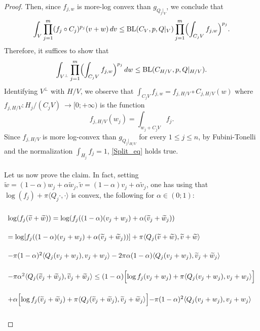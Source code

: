 \documentclass[10pt,a4paper]{amsart}
\newcommand{\ds}{\displaystyle}
\newcommand{\nm}{\noalign{\smallskip}}
\renewcommand{\tilde}{\widetilde}
\begin{document}
\begin{proof}
    Then, since $f_{j,w}$ is more-log convex than $g_{Q_j|_V}$, we conclude that $$\int_V \prod_{j=1}^m (f_j \circ C_j)^{p_j}(v+w)\, dv \leq \mathrm{BL}(\textbf{C}_V,p,\textbf{Q}|_V)\prod_{j=1}^m \Bigl (\int_{C_jV}f_{j,w}\Bigl)^{p_j}.$$ Therefore, it suffices to show that \begin{equation} \label{Split_eq}\int_{V^\perp}\prod_{j=1}^m \Bigl( \int_{C_jV}f_{j,w}\Bigl)^{p_j}\, dw \leq \mathrm{BL}(\textbf{C}_{H/V},p,\textbf{Q}|_{H/V}).\end{equation} Identifying $V^\perp$ with $H/V$, we observe that $\ds \int_{C_jV}f_{j,w}=f_{j,H/V}\circ C_{j,H/V}(w)$ where $f_{j,H/V}:H_j/(C_jV)\ \longrightarrow [0;+\infty)$ is the function $$f_{j,H/V}(w_j)=\int_{w_j+C_jV}f_j.$$ 
    Since $f_{j,{H/V}}$ is more log-convex than $g_{Q_j|_{H/V}}$ for every $1 \leq j \leq n$, by Fubini-Tonelli and the normalization $\int_{H_j}f_j=1$, \cref{Split_eq} holds true. \\ \hfill \\ Let us now prove the claim. In fact, setting $\tilde w=(1-\alpha)w_j+\alpha \tilde w_j, \tilde v=(1-\alpha)v_j+\alpha \tilde v_j$, one has using that $\log(f_j)+\pi \langle Q_j \cdot,\cdot \rangle$ is convex, the following for $\alpha \in (0;1)$:  \begin{equation} \label{Log_Convexity_Superposition} \begin{array}{lll}
    \\ \log(f_j(\tilde v+\tilde w)) = \log(f_j((1-\alpha)(v_j+w_j)+\alpha(\tilde v_j+\tilde w_j)) \\ \\
    \nm 
    = \log[f_j((1-\alpha)(v_j+w_j)+\alpha(\tilde v_j+\tilde w_j))] +\pi \langle Q_j (\tilde v+\tilde w),\tilde v+\tilde w \rangle \\ \\
    \nm 
    -\pi(1-\alpha)^2 \langle Q_j(v_j+w_j),v_j+w_j \rangle-2\pi \alpha(1-\alpha)\langle Q_j(v_j+w_j),\tilde v_j+\tilde w_j \rangle   \\ \\
    \nm 
    -\pi \alpha^2 \langle Q_j(\tilde v_j+\tilde w_j),\tilde v_j+\tilde w_j \rangle \leq (1-\alpha)\Bigl [ \log f_j(v_j+w_j)+\pi \langle Q_j(v_j+w_j),v_j+w_j \rangle \Bigl] \\ \\
    \nm 
    +\alpha \Bigl [ \log f_j(\tilde v_j+\tilde w_j)+\pi \langle Q_j(\tilde v_j+\tilde w_j),\tilde v_j+\tilde w_j\rangle \Bigl]-\pi(1-\alpha)^2 \langle Q_j(v_j+w_j),v_j+w_j \rangle \\ \\

\end{array}
\end{equation}
\end{proof}
\end{document}
